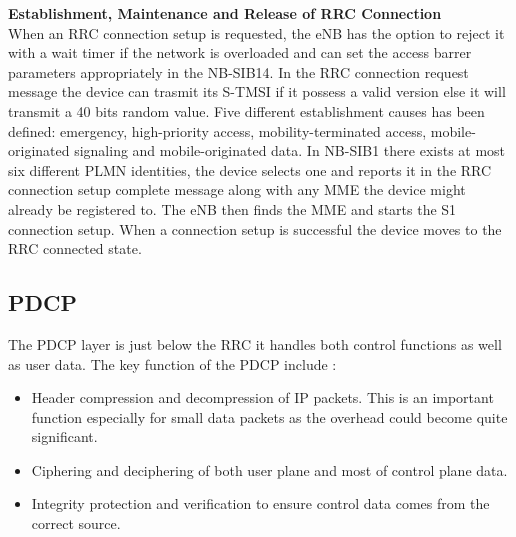 \textbf{Establishment, Maintenance and Release of \gls{RRC} Connection} \\
When an \gls{RRC} connection setup is requested, the \gls{eNB} has the option to reject it with a wait timer if the network is overloaded and can set the access barrer parameters appropriately in the \gls{NB-SIB}14. In the \gls{RRC} connection request message the device can trasmit its \gls{S-TMSI} if it possess a valid version else it will transmit a 40 bits random value. Five different establishment causes has been defined: emergency, high-priority access, mobility-terminated access, mobile-originated signaling and mobile-originated data. In \gls{NB-SIB}1 there exists at most six different \gls{PLMN} identities, the device selects one and reports it in the  \gls{RRC} connection setup complete message along with any \gls{MME} the device might already be registered to. The \gls{eNB} then finds the \gls{MME} and starts the S1 connection setup. When a connection setup is successful the device moves to the \gls{RRC} connected state. \citep[ch. 6.6]{book_LTE_for_UMTS}





\subsection{PDCP}
The \gls{PDCP} layer is just below the \gls{RRC} it handles both control functions as well as user data. The key function of the \gls{PDCP} include \citep[ch. 6.5]{book_LTE_for_UMTS}:
\begin{itemize}
	\item Header compression and decompression of \gls{IP} packets. This is an important function especially for small data packets as the overhead could become quite significant.
	\item Ciphering and deciphering of both user plane and most of control plane data.
	\item Integrity protection and verification to ensure control data comes from the correct source.
\end{itemize}

